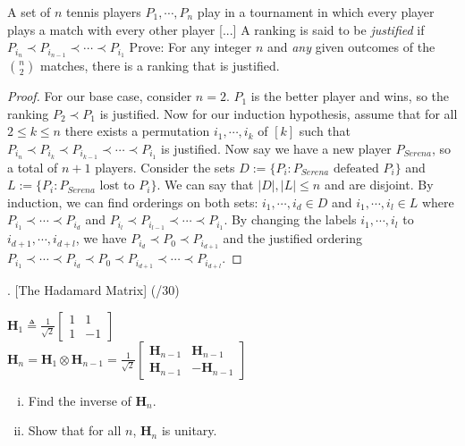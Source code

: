 \documentclass[11pt]{article}
\newenvironment{solution}{\begin{mdframed}[skipabove=\baselineskip,innertopmargin=\baselineskip,innerbottommargin=\baselineskip]
  }{\end{mdframed}}
\begin{document}
 A set of $n$ tennis players $P_1,\cdots,P_n$ play in a tournament in which every player plays a match with every other player [...] A ranking is said to be \textit{justified} if $P_{i_n}\prec P_{i_{n-1}}\prec \cdots \prec P_{i_1}$ Prove: For any integer $n$ and \textit{any} given outcomes of the $n \choose 2$ matches, there is a ranking that is justified.
\begin{solution}
    \begin{proof}
    For our base case, consider $n=2$. $P_1$ is the better player and wins, so the ranking $P_2 \prec P_1$ is justified. Now for our induction hypothesis, assume that for all $2 \leq k  \leq n$ there exists a permutation $i_1,\cdots,i_k$ of $[k]$ such that $P_{i_n}\prec P_{i_k}\prec P_{i_{k-1}}\prec\cdots\prec P_{i_1}$ is justified. Now say we have a new player $P_{Serena}$, so a total of $n+1$ players. Consider the sets $D:=\{P_i : P_{Serena} \text{ defeated } P_i\}$ and $L:=\{P_i : P_{Serena} \text{ lost to } P_i\}$. We can say that $|D|,|L|\leq n$ and are disjoint. By induction, we can find orderings on both sets: $i_1,\cdots,i_d\in D$ and $i_1,\cdots,i_l\in L$ where $P_{i_1}\prec\cdots\prec P_{i_d}$ and $P_{i_l}\prec P_{i_{l-1}}\prec\cdots\prec P_{i_1}$. By changing the labels $i_1,\cdots,i_l$ to $i_{d+1},\cdots,i_{d+l}$, we have $P_{i_d}\prec P_{0}\prec P_{i_{d+1}}$ and the justified ordering
    $P_{i_{1}}\prec\cdots\prec P_{i_d}\prec P_{0}\prec P_{i_{d+1}} \prec\cdots\prec P_{i_{d+l}}$.
    \end{proof}
\end{solution}

\newpage

 . [The Hadamard Matrix] (/30)

 \begin{center}
    $\textbf{H}_1 \triangleq \frac{1}{\sqrt{2}} \begin{bmatrix}
    1 & 1 \\ 1 & -1 \end{bmatrix} $ \\
    $\textbf{H}_n = \textbf{H}_1 \otimes \textbf{H}_{n-1} = \frac{1}{\sqrt{2}} \begin{bmatrix}
    \textbf{H}_{n-1} & \textbf{H}_{n-1} \\ \textbf{H}_{n-1} & -\textbf{H}_{n-1} 
    \end{bmatrix} $
 \end{center}

\begin{enumerate}[(i)]
\item Find the inverse of $\textbf{H}_n$.\\

\item Show that for all $n$, $\textbf{H}_n$ is unitary.
\end{enumerate}
\end{document}
